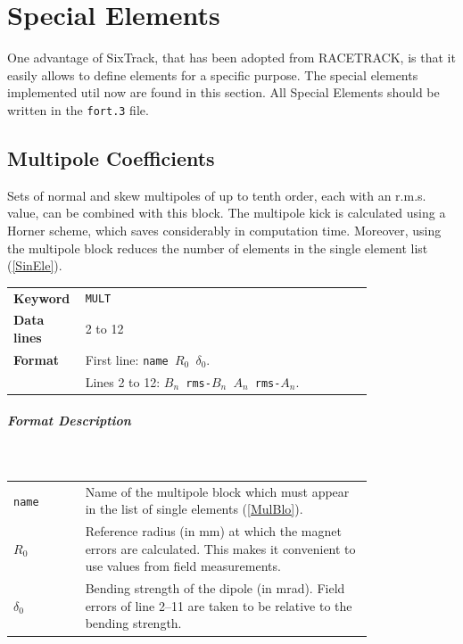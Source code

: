 
\chapter{Special Elements} \label{SpecElem}

One advantage of SixTrack, that has been adopted from RACETRACK, is that it easily allows to define elements for a specific purpose.
The special elements implemented util now are found in this section.
All Special Elements should be written in the \texttt{fort.3} file.

\section{Multipole Coefficients} \label{MulCoe}

Sets of normal and skew multipoles of up to tenth order, each with an r.m.s. value, can be combined with this block.
The multipole kick is calculated using a Horner scheme, which saves considerably in computation time.
Moreover, using the multipole block reduces the number of elements in the single element list (\ref{SinEle}).

\bigskip
\begin{tabular}{@{}lp{0.8\linewidth}}
    \textbf{Keyword}    & \texttt{MULT}\index{MULT} \\
    \textbf{Data lines} & 2 to 12 \\
    \textbf{Format}     & First line: \texttt{name $R_{0}$ $\delta_{0}$}. \\
                        & Lines 2 to 12: \texttt{$B_{n}$ rms-$B_{n}$ $A_{n}$ rms-$A_{n}$}.
\end{tabular}

\paragraph{Format Description}~

\bigskip
\begin{tabular}{@{}lp{0.8\linewidth}}
    \texttt{name}    & Name of the multipole block which must appear in the list of single elements\index{single elements} (\ref{MulBlo}). \\
    \texttt{$R_{0}$} & Reference radius (in mm) at which the magnet errors are calculated. This makes it convenient to use values from field measurements. \\
    \texttt{$\delta_{0}$} & Bending strength\index{bending strength} of the dipole (in mrad). Field errors\index{field errors} of line 2--11 are taken to be relative to the bending strength.
\end{tabular}

